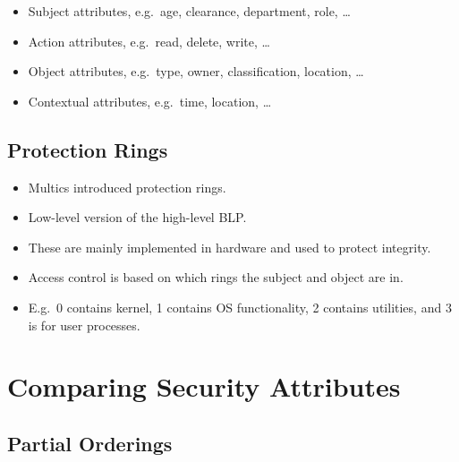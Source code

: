 \begin{frame}
  \begin{example}[Attributes]
    \begin{itemize}
      \item Subject attributes, e.g.\ age, clearance, department, role, \dots
      \item Action attributes, e.g.\ read, delete, write, \dots
      \item Object attributes, e.g.\ type, owner, classification, location, 
        \dots
      \item Contextual attributes, e.g.\ time, location, \dots
    \end{itemize}
  \end{example}
\end{frame}

\subsection{Protection Rings}

\begin{frame}
  \begin{itemize}
    \item Multics introduced protection rings.

    \item Low-level version of the high-level BLP.

    \item These are mainly implemented in hardware and used to protect 
      integrity.

    \item Access control is based on which rings the subject and object are in.

    \item E.g.\ 0 contains kernel, 1 contains OS functionality, 2 contains 
      utilities, and 3 is for user processes.

  \end{itemize}
\end{frame}


\section{Comparing Security Attributes}

\subsection{Partial Orderings}

